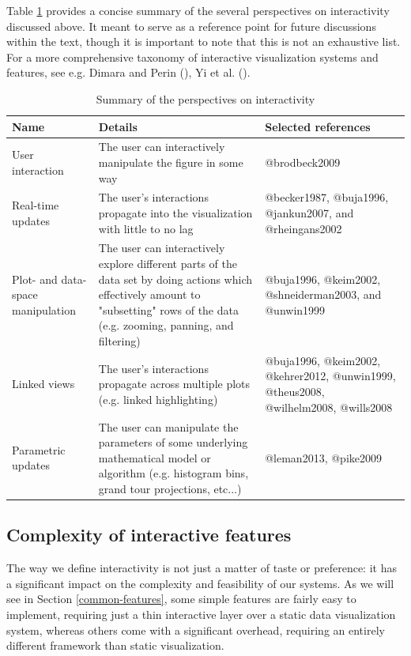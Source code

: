 \documentclass[
]{book}
\begin{document}
Table \ref{tab:definitions} provides a concise summary of the several perspectives on interactivity discussed above. It meant to serve as a reference point for future discussions within the text, though it is important to note that this is not an exhaustive list. For a more comprehensive taxonomy of interactive visualization systems and features, see e.g. Dimara and Perin (), Yi et al. ().

\begin{table}
\centering
\caption{\label{tab:definitions}Summary of the perspectives on interactivity}
\centering
\begin{tabular}[t]{l|l|l}
\hline
Name & Details & Selected references\\
\hline
User interaction & The user can interactively manipulate the figure in some way & @brodbeck2009\\
\hline
Real-time updates & The user's interactions propagate into the visualization with little to no lag & @becker1987, @buja1996, @jankun2007, and @rheingans2002\\
\hline
Plot- and data-space manipulation & The user can interactively explore different parts of the data set by doing actions which effectively amount to "subsetting" rows of the data (e.g. zooming, panning, and filtering) & @buja1996, @keim2002, @shneiderman2003, and @unwin1999\\
\hline
Linked views & The user's interactions propagate across multiple plots (e.g. linked highlighting) & @buja1996, @keim2002, @kehrer2012, @unwin1999, @theus2008, @wilhelm2008, @wills2008\\
\hline
Parametric updates & The user can manipulate the parameters of some underlying mathematical model or algorithm (e.g. histogram bins, grand tour projections, etc...) & @leman2013, @pike2009\\
\hline
\end{tabular}
\end{table}

\subsection{Complexity of interactive features}\label{complexity-of-features}

The way we define interactivity is not just a matter of taste or preference: it has a significant impact on the complexity and feasibility of our systems. As we will see in Section \ref{common-features}, some simple features are fairly easy to implement, requiring just a thin interactive layer over a static data visualization system, whereas others come with a significant overhead, requiring an entirely different framework than static visualization.
\end{document}
